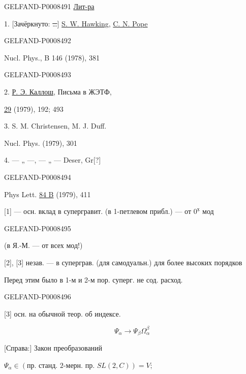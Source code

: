 \begin{GelfandAdjacentEvidence}{GELFAND-P000849}{1}
\uline{Лит-ра}

1. [Зачёркнуто: \sout{…}] \uline{S. W. Hawking}, \uline{C. N. Pope}
\end{GelfandAdjacentEvidence}
\begin{GelfandAdjacentEvidence}{GELFAND-P000849}{2}


Nucl. Phys., B 146 (1978), 381
\end{GelfandAdjacentEvidence}
\begin{GelfandAdjacentEvidence}{GELFAND-P000849}{3}


2. \uline{Р. Э. Каллош}, Письма в ЖЭТФ,

\uline{29} (1979), 192; 493

3. S. M. Christensen, M. J. Duff.

Nucl. Phys. (1979), 301

4. — „ —, — „ — Deser, Gr[?]
\end{GelfandAdjacentEvidence}
\begin{GelfandAdjacentEvidence}{GELFAND-P000849}{4}


Phys Lett. \uline{84 B} (1979), 411

[1] — осн. вклад в супергравит. (в 1-петлевом прибл.) — от \(0^{\underline{\text{х}}}\) мод
\end{GelfandAdjacentEvidence}
\begin{GelfandAdjacentEvidence}{GELFAND-P000849}{5}


(в Я.-М. — от всех мод!)

[2], [3] незав. — в суперграв. (для самодуальн.) для более высоких порядков

Перед этим было в 1-м и 2-м пор. суперг. не сод. расход.
\end{GelfandAdjacentEvidence}
\begin{GelfandAdjacentEvidence}{GELFAND-P000849}{6}


[3] осн. на обычной теор. об индексе.


\[
\Psi_\alpha\longrightarrow\Psi_\beta\Omega_\alpha^\beta \tag{1}
\]

[Справа:] Закон преобразований

\(\Psi_\alpha\in(\text{пр. станд. 2-мерн. пр. }SL(2,C))=V;\)
\end{GelfandAdjacentEvidence}
